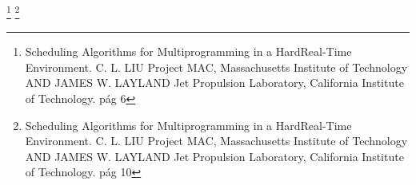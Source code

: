 \documentclass[a4paper]{article}
\begin{document}
\footnote[1]{Scheduling Algorithms for Multiprogramming in a HardReal-Time Environment.
C. L. LIU Project MAC, Massachusetts Institute of Technology AND JAMES W. LAYLAND Jet Propulsion Laboratory, California Institute of Technology. pág 6}\newline
\footnote[2]{Scheduling Algorithms for Multiprogramming in a HardReal-Time Environment.
C. L. LIU Project MAC, Massachusetts Institute of Technology AND JAMES W. LAYLAND Jet Propulsion Laboratory, California Institute of Technology. pág 10}
\end{document}
